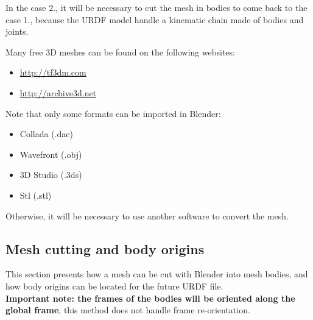 \documentclass[12pt]{article}
\begin{document}
\noindent
In the case 2., it will be necessary to cut the mesh in bodies to come back to the case 1., because the URDF model handle a kinematic chain made of bodies and joints.

\noindent
Many free 3D meshes can be found on the following websites:
\begin{itemize}
\item \url{http://tf3dm.com}
\item \url{http://archive3d.net}
\end{itemize}
Note that only some formats can be imported in Blender:
\begin{itemize}
	\item Collada (.dae)
	\item Wavefront (.obj)
	\item 3D Studio (.3ds)
	\item Stl (.stl)
\end{itemize}
Otherwise, it will be necessary to use another software to convert the mesh.

\subsection{Mesh cutting and body origins}
This section presents how a mesh can be cut with Blender into mesh bodies, and how body origins can be located for the future URDF file.\\
\textbf{Important note: the frames of the bodies will be oriented along the global frame}, this method does not handle frame re-orientation.
\end{document}

